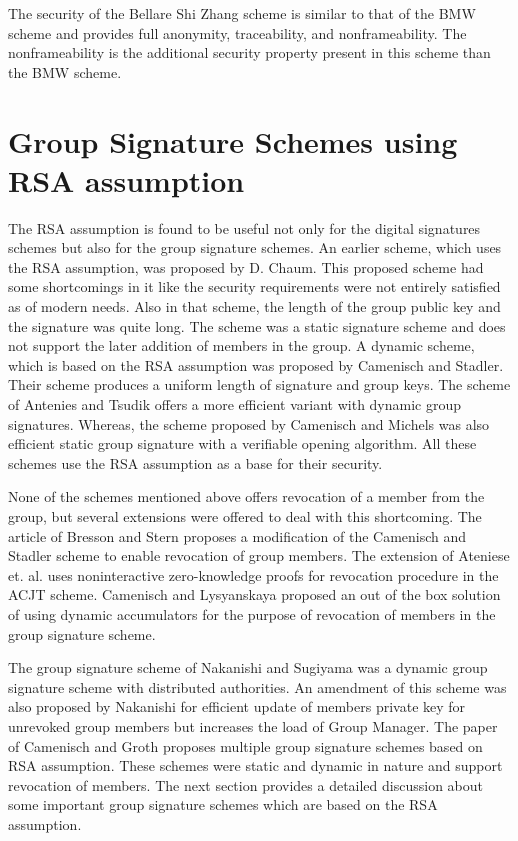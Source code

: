 The security of the Bellare Shi Zhang scheme is similar to that of the BMW scheme and provides full anonymity, traceability, and nonframeability. The nonframeability is the additional security property present in this scheme than the BMW scheme.

\section[Group Signature Schemes using RSA assumption]{Group Signature Schemes using\\ RSA assumption}
The RSA assumption is found to be useful not only for the digital signatures schemes but also for the group signature schemes. An earlier scheme, which uses the RSA assumption, was proposed by D. Chaum\cite{chaum1991group}. This proposed scheme had some shortcomings in it like the security requirements were not entirely satisfied as of modern needs. Also in that scheme, the length of the group public key and the signature was quite long. The scheme was a static signature scheme and does not support the later addition of members in the group. A dynamic scheme, which is based on the RSA assumption was proposed by Camenisch and Stadler\cite{camenisch1997efficient}. Their scheme produces a uniform length of signature and group keys. The scheme of Antenies and Tsudik offers a more efficient variant with dynamic group signatures\cite{ateniese1999group}. Whereas, the scheme proposed by Camenisch and Michels was also efficient static group signature with a verifiable opening algorithm\cite{camenisch1998group}. All these schemes use the RSA assumption as a base for their security. 

None of the schemes mentioned above offers revocation of a member from the group, but several extensions were offered to deal with this shortcoming. The article of Bresson and Stern proposes a modification of the Camenisch and Stadler scheme\cite{camenisch1997efficient} to enable revocation of group members\cite{bresson2001efficient}. The extension of Ateniese et. al. \cite{ateniese2002quasi} uses noninteractive zero-knowledge proofs for revocation procedure in the ACJT scheme. Camenisch and Lysyanskaya proposed an out of the box solution of using dynamic accumulators for the purpose of revocation of members in the group signature scheme\cite{camenisch2002dynamic}. 

The group signature scheme of Nakanishi and Sugiyama was a dynamic group signature scheme with distributed authorities\cite{nakanishi2004group}. An amendment of this scheme was also proposed by Nakanishi for efficient update of members private key for unrevoked group members but increases the load of Group Manager\cite{nakanishi2005group}. The paper of Camenisch and Groth proposes multiple group signature schemes based on RSA assumption\cite{camenisch2004group}. These schemes were static and dynamic in nature and support revocation of members. The next section provides a detailed discussion about some important group signature schemes which are based on the RSA assumption.


